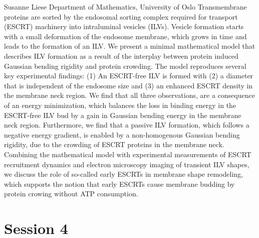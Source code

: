 \documentclass{article}
\begin{document}
{Susanne Liese}
{Department of Mathematics, University of Oslo}
{Transmembrane proteins are sorted by the endosomal sorting complex required for transport (ESCRT) machinery
into intraluminal vesicles (ILVs). Vesicle formation starts with a small deformation of the endosome membrane,
which grows in time and leads to the formation of an ILV. We present a minimal mathematical model that
describes ILV formation as a result of the interplay between protein induced Gaussian bending rigidity and
protein crowding. The model reproduces several key experimental findings: (1) An ESCRT-free ILV is formed with
(2) a diameter that is independent of the endosome size and (3) an enhanced ESCRT density in the membrane neck
region. We find that all three observations, are a consequence of an energy minimization, which balances the
loss in binding energy in the ESCRT-free ILV bud by a gain in Gaussian bending energy in the membrane neck
region. Furthermore, we find that a passive ILV formation, which follows a negative energy gradient, is
enabled by a non-homogenous Gaussian bending rigidity, due to the crowding of ESCRT proteins in the membrane
neck. Combining the mathematical model with experimental measurements of ESCRT recruitment dynamics and 
electron microscopy imaging of transient ILV shapes, we discuss the role of so-called early ESCRTs in membrane
shape remodeling, which supports the notion that early ESCRTs cause membrane budding by protein crowing
without ATP consumption.}

\newpage
\section*{Session 4}
\end{document}
